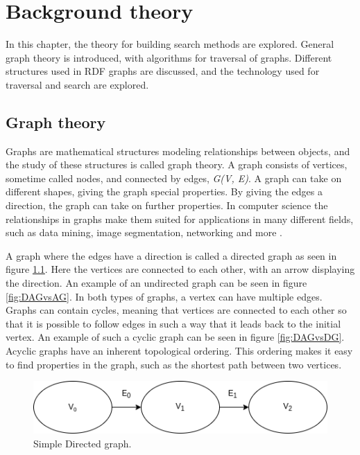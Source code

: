 \chapter{Background theory}
\label{cha:background_theory}
In this chapter, the theory for building search methods are explored. General graph theory is introduced, with algorithms for traversal of graphs. Different structures used in RDF graphs are discussed, and the technology used for traversal and search are explored.

\section{Graph theory}
Graphs are mathematical structures modeling relationships between objects, and the study of these structures is called graph theory. A graph consists of vertices, sometime called nodes, and connected by edges, \emph{G(V, E)}. A graph can take on different shapes, giving the graph special properties. By giving the edges a direction, the graph can take on further properties. In computer science the relationships in graphs make them suited for applications in many different fields, such as data mining, image segmentation, networking and more \cite{riaz2011applications}. 

A graph where the edges have a direction is called a directed graph as seen in figure \ref{fig:DAG}. Here the vertices are connected to each other, with an arrow displaying the direction. An example of an undirected graph can be seen in figure \ref{fig:DAGvsAG}. In both types of graphs, a vertex can have multiple edges. Graphs can contain cycles, meaning that vertices are connected to each other so that it is possible to follow edges in such a way that it leads back to the initial vertex. An example of such a cyclic graph can be seen in figure \ref{fig:DAGvsDG}. Acyclic graphs have an inherent topological ordering. This ordering makes it easy to find properties in the graph, such as the shortest path between two vertices.

\begin{figure}
    \centering
    \includegraphics[scale=0.5]{figs/simpleDAG.png}
    \caption{Simple Directed graph.}
    \label{fig:DAG}
\end{figure}

